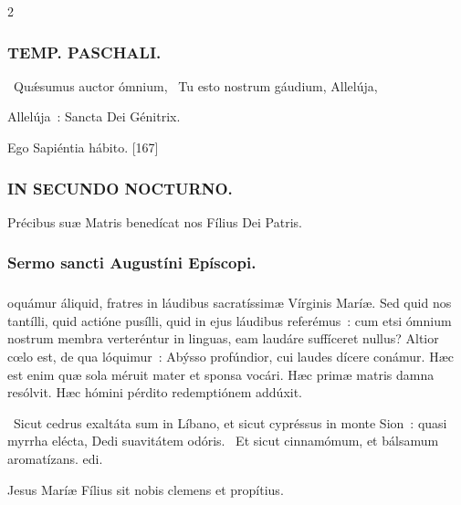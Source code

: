 \documentclass[9pt,twoside]{extarticle}
\begin{document}
\begin{multicols}{2}
{\subsubsection*{\center \textsc{TEMP. PASCHALI.}}
\begin{tightlist}{}
\item {}~Quǽsumus auctor ómnium, ~Tu esto nostrum gáudium,  Allelúja, 
\item {} Allelúja~: Sancta Dei Génitrix.
\item {} Ego Sapiéntia hábito. [167]
\end{tightlist}

\subsubsection*{\center \textsc{IN SECUNDO NOCTURNO.}}
\begin{tightlist}{}
\item {\small {} Précibus suæ Matris benedícat nos Fílius Dei Patris.}
\end{tightlist}
\subsubsection*{\center Sermo sancti Augustíni Epíscopi.}
\subsubsection*{\center {}}
oquámur áliquid, fratres in láudibus sacratíssimæ Vírginis Maríæ. Sed quid nos tantílli, quid actióne pusílli, quid in ejus láudibus referémus~: cum etsi ómnium nostrum membra verteréntur in linguas, eam laudáre suffíceret nullus? Altior cœlo est, de qua lóquimur~: Abýsso profúndior, cui laudes dícere conámur. Hæc est enim quæ sola méruit mater et sponsa vocári. Hæc primæ matris damna resólvit. Hæc hómini pérdito redemptiónem addúxit.

\begin{tightlist}{}
\item {}~Sicut cedrus exaltáta sum in Líbano, et sicut cypréssus in monte Sion~: quasi myrrha elécta, \textred{*} Dedi suavitátem odóris.
~Et sicut cinnamómum, et bálsamum aromatízans. edi.
\item {\small {} Jesus Maríæ Fílius sit nobis clemens et propítius.}
\end{tightlist}

}
\end{multicols}
\end{document}
